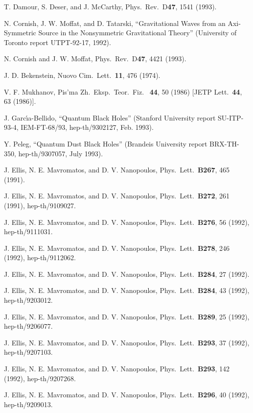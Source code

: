 \begin{thebibliography}{999}
 T. Damour, S. Deser, and J. McCarthy,
Phys.\ Rev.\ D{\bf 47}, 1541 (1993).

 N. Cornish, J. W. Moffat, and D. Tatarski,
``Gravitational Waves from an Axi-Symmetric Source in
the Nonsymmetric Gravitational Theory'' (University of Toronto
report UTPT-92-17, 1992).

 N. Cornish and J. W. Moffat, Phys.\ Rev.\ D{\bf 47},
4421 (1993).

 J. D. Bekenstein, Nuovo Cim.\ Lett.\ {\bf 11},
476 (1974).

 V. F. Mukhanov, Pis'ma Zh.\ Eksp.\ Teor.\ Fiz.\ {\bf
44},
50 (1986) [JETP Lett.\ {\bf 44}, 63 (1986)].

 J. Garc\'{\i}a-Bellido, ``Quantum Black Holes''
(Stanford University report SU-ITP-93-4, IEM-FT-68/93,
hep-th/9302127,
Feb. 1993).

 Y. Peleg, ``Quantum Dust Black Holes''
(Brandeis University report BRX-TH-350, hep-th/9307057, July 1993).

 J. Ellis, N. E. Mavromatos, and D. V. Nanopoulos,
Phys.\ Lett.\ {\bf B267}, 465 (1991).

 J. Ellis, N. E. Mavromatos, and D. V. Nanopoulos,
Phys.\ Lett.\ {\bf B272}, 261 (1991), hep-th/9109027.

 J. Ellis, N. E. Mavromatos, and D. V. Nanopoulos,
Phys.\ Lett.\ {\bf B276}, 56 (1992), hep-th/9111031.

 J. Ellis, N. E. Mavromatos, and D. V. Nanopoulos,
Phys.\ Lett.\ {\bf B278}, 246 (1992), hep-th/9112062.

 J. Ellis, N. E. Mavromatos, and D. V. Nanopoulos,
Phys.\ Lett.\ {\bf B284}, 27 (1992).

 J. Ellis, N. E. Mavromatos, and D. V. Nanopoulos,
Phys.\ Lett.\ {\bf B284}, 43 (1992), hep-th/9203012.

 J. Ellis, N. E. Mavromatos, and D. V. Nanopoulos,
Phys.\ Lett.\ {\bf B289}, 25 (1992), hep-th/9206077.

 J. Ellis, N. E. Mavromatos, and D. V. Nanopoulos,
Phys.\ Lett.\ {\bf B293}, 37 (1992), hep-th/9207103.

 J. Ellis, N. E. Mavromatos, and D. V. Nanopoulos,
Phys.\ Lett.\ {\bf B293}, 142 (1992), hep-th/9207268.

 J. Ellis, N. E. Mavromatos, and D. V. Nanopoulos,
Phys.\ Lett.\ {\bf B296}, 40 (1992), hep-th/9209013.


\end{thebibliography}
